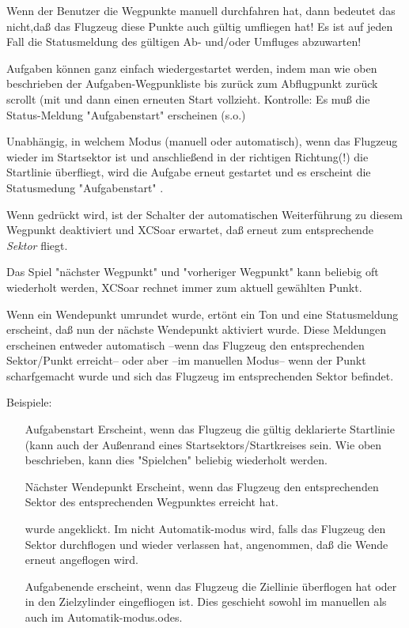 \warning Wenn der Benutzer die Wegpunkte  manuell durchfahren hat, dann bedeutet das nicht,daß das Flugzeug diese Punkte auch gültig umfliegen hat! Es ist auf jeden Fall die Statusmeldung des gültigen Ab- und/oder Umfluges abzuwarten!


\tip Aufgaben können ganz einfach wiedergestartet  werden, indem man wie oben beschrieben der Aufgaben-Wegpunkliste bis zurück zum Abflugpunkt zurück scrollt (mit  und dann einen erneuten Start vollzieht. Kontrolle: Es muß die Status-Meldung "Aufgabenstart" erscheinen (s.o.)

Unabhängig, in welchem Modus (manuell oder automatisch), wenn das Flugzeug wieder im Startsektor ist und anschließend in der \textcolor[rgb]{0.00,0.00,0.50}{richtigen Richtung(!)} die Startlinie überfliegt, wird die Aufgabe erneut gestartet und es erscheint die Statusmedung  "Aufgabenstart" .


Wenn  gedrückt wird, ist der Schalter der automatischen Weiterführung zu diesem Wegpunkt deaktiviert und \textsf{XCSoar} erwartet, daß erneut zum entsprechende \textsl{Sektor} fliegt.

Das Spiel "nächster Wegpunkt" und "vorheriger Wegpunkt" kann  beliebig oft wiederholt werden, \textsf{XCSoar} rechnet immer zum aktuell gewählten Punkt.


Wenn ein Wendepunkt umrundet  wurde, ertönt ein Ton und eine Statusmeldung erscheint, daß nun  der nächste Wendepunkt aktiviert wurde. Diese Meldungen erscheinen entweder automatisch --wenn das Flugzeug den entsprechenden Sektor/Punkt erreicht--  oder aber --im manuellen Modus-- wenn der Punkt scharfgemacht wurde und sich das Flugzeug im entsprechenden Sektor befindet.

Beispiele:
\begin{itemize}
\item[Aufgabenstart]  Erscheint, wenn das Flugzeug die gültig deklarierte Startlinie (kann auch der Außenrand eines Startsektors/Startkreises sein. Wie oben beschrieben, kann dies "Spielchen" beliebig wiederholt werden.

\item[Nächster Wendepunkt]  Erscheint, wenn das Flugzeug den entsprechenden Sektor des entsprechenden Wegpunktes erreicht hat.

  wurde angeklickt. \tip  Im nicht Automatik-modus
 wird, falls das Flugzeug den Sektor durchflogen und wieder verlassen hat, angenommen, daß die Wende erneut angeflogen  wird.

\item[Aufgabenende]  erscheint, wenn das Flugzeug die Ziellinie überflogen hat oder in den Zielzylinder  eingefliogen ist. Dies geschieht sowohl im manuellen als auch im Automatik-modus.odes.
\end{itemize}

